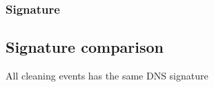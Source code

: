 \subsubsection{Signature}


\subsection{Signature comparison}
All cleaning events has the same DNS signature